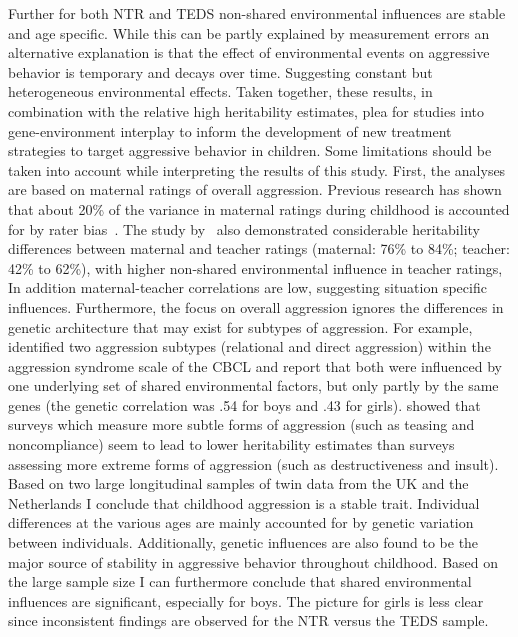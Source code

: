 Further for both NTR and TEDS non-shared environmental influences are stable and age specific.
While this can be partly explained by measurement errors an alternative explanation is that the effect of environmental events on aggressive behavior is temporary and decays over time.
Suggesting constant but heterogeneous environmental effects.
Taken together, these results, in combination with the relative high heritability estimates, plea for studies into gene-environment interplay to inform the development of new treatment strategies	to target aggressive behavior in children.
Some limitations should be taken into account while interpreting the results of this study.
First, the analyses are based on maternal ratings of overall aggression.
Previous research has shown that about 20\% of the variance in maternal ratings during childhood is accounted for by rater bias~\cite{Bartels2007}.
The study by~\citet{Haberstick2006} also demonstrated considerable heritability differences between maternal and teacher ratings (maternal: 76\% to 84\%; teacher: 42\% to 62\%), with higher non-shared environmental influence in teacher ratings, In addition maternal-teacher correlations are low, suggesting situation specific influences.
Furthermore, the focus on overall aggression ignores the differences in genetic architecture that may exist for subtypes of aggression.
For example,~\citet{Ligthart2005} identified two aggression subtypes (relational and direct aggression) within the aggression syndrome scale of the CBCL and report that both were influenced by one underlying set of shared environmental factors, but only partly by the same genes (the genetic correlation was .54 for boys and .43 for girls).
\citet{Ghodsian-Carpey1987} showed that surveys which measure more subtle forms of aggression (such as teasing and noncompliance) seem to lead to lower heritability estimates than surveys assessing more extreme forms of aggression (such as destructiveness and insult).
Based on two large longitudinal samples of twin data from the UK and the Netherlands I conclude that childhood aggression is a stable trait.
Individual differences at the various ages are mainly accounted for by genetic variation between individuals.
Additionally, genetic influences are also found to be the major source of stability in aggressive behavior throughout childhood.
Based on the large sample size I can furthermore conclude that shared environmental influences are significant, especially for boys.
The picture for girls is less clear since inconsistent findings are observed for the NTR versus the TEDS sample.
